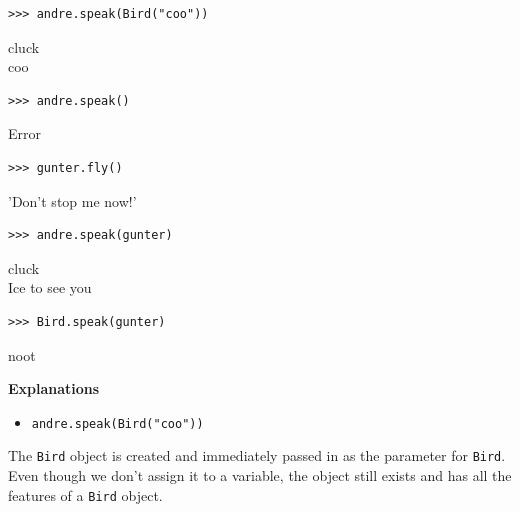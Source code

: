 \newpage
\begin{blocksection}
\vspace{9\baselineskip}
\begin{lstlisting}
>>> andre.speak(Bird("coo"))
\end{lstlisting}
\begin{solution}[.2in]
cluck \\
coo
\end{solution}

\vspace{3\baselineskip}
\begin{lstlisting}
>>> andre.speak()
\end{lstlisting}
\begin{solution}[.2in]
Error
\end{solution}

\vspace{3\baselineskip}
\begin{lstlisting}
>>> gunter.fly()
\end{lstlisting}
\begin{solution}[.2in]
'Don't stop me now!'
\end{solution}

\vspace{3\baselineskip}
\begin{lstlisting}
>>> andre.speak(gunter)
\end{lstlisting}
\begin{solution}[.2in]
cluck \\
Ice to see you
\end{solution}

\vspace{3\baselineskip}
\begin{lstlisting}
>>> Bird.speak(gunter)
\end{lstlisting}
\begin{solution}[.2in]
noot
\end{solution}
\end{blocksection}
\onecolumn

\begin{solution}[-32pt]
\begin{blocksection}
\textbf{Explanations}

\begin{itemize}
    \item \lstinline{andre.speak(Bird("coo"))}
\end{itemize}
The \lstinline{Bird} object is created and immediately passed in as the parameter for \lstinline{Bird}. Even though we don't assign it to a variable, the object still exists and has all the features of a \lstinline{Bird} object.
\end{blocksection}
\end{solution}

